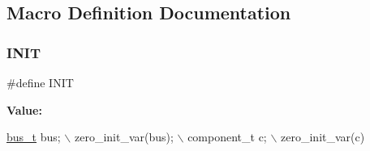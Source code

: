 \subsection{Macro Definition Documentation}
\mbox{\label{unit-test-bus_8c_ab5889105dcd019008c9448dff61323f6}} 
\subsubsection{\texorpdfstring{I\+N\+IT}{INIT}}
{\footnotesize\ttfamily \#define I\+N\+IT}

{\bfseries Value\+:}
\begin{DoxyCode}
\hyperlink{bus_8h_a68c80bdf896e826e4cb082244ce35427}{bus\_t} bus; \(\backslash\)
    zero\_init\_var(bus); \(\backslash\)
    component\_t c; \(\backslash\)
    zero\_init\_var(c)
\end{DoxyCode}
